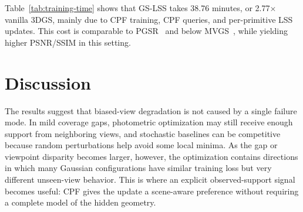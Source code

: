 \documentclass[lettersize,journal]{IEEEtran}
\begin{document}
\begin{table}[h]
\centering
\caption{Average training time and rendering quality comparison on Tanks \& Temples~\cite{tankstemples} with a 60$^\circ$ coverage gap.}
\label{tab:training-time}
\setlength{\tabcolsep}{3pt}
\end{table}

Table~\ref{tab:training-time} shows that GS-LSS takes 38.76 minutes, or 2.77$\times$ vanilla 3DGS, mainly due to CPF training, CPF queries, and per-primitive LSS updates. This cost is comparable to PGSR~\cite{pgsr} and below MVGS~\cite{mvgs}, while yielding higher PSNR/SSIM in this setting.

\section{Discussion}

The results suggest that biased-view degradation is not caused by a single failure mode. In mild coverage gaps, photometric optimization may still receive enough support from neighboring views, and stochastic baselines can be competitive because random perturbations help avoid some local minima. As the gap or viewpoint disparity becomes larger, however, the optimization contains directions in which many Gaussian configurations have similar training loss but very different unseen-view behavior. This is where an explicit observed-support signal becomes useful: CPF gives the update a scene-aware preference without requiring a complete model of the hidden geometry.
\end{document}
